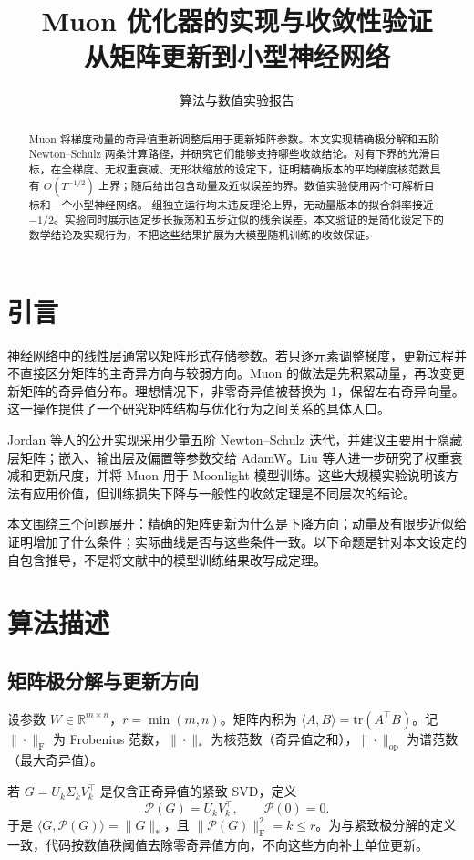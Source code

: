 \documentclass[11pt,a4paper]{article}
\title{Muon 优化器的实现与收敛性验证\\[5pt]\large 从矩阵更新到小型神经网络}
\author{算法与数值实验报告}
\date{}
\theoremstyle{definition}
\newcommand{\F}{\mathrm{F}}
\newcommand{\op}{\mathrm{op}}
\newcommand{\Pol}{\mathcal{P}}
\begin{document}
\maketitle
\begin{abstract}
Muon 将梯度动量的奇异值重新调整后用于更新矩阵参数。本文实现精确极分解和五阶 Newton--Schulz 两条计算路径，并研究它们能够支持哪些收敛结论。对有下界的光滑目标，在全梯度、无权重衰减、无形状缩放的设定下，证明精确版本的平均梯度核范数具有 $O(T^{-1/2})$ 上界；随后给出包含动量及近似误差的界。数值实验使用两个可解析目标和一个小型神经网络。\NumRuns{} 组独立运行均未违反理论上界，无动量版本的拟合斜率接近 $-1/2$。实验同时展示固定步长振荡和五步近似的残余误差。本文验证的是简化设定下的数学结论及实现行为，不把这些结果扩展为大模型随机训练的收敛保证。
\end{abstract}

\section{引言}
神经网络中的线性层通常以矩阵形式存储参数。若只逐元素调整梯度，更新过程并不直接区分矩阵的主奇异方向与较弱方向。Muon 的做法是先积累动量，再改变更新矩阵的奇异值分布。理想情况下，非零奇异值被替换为 1，保留左右奇异向量。这一操作提供了一个研究矩阵结构与优化行为之间关系的具体入口。

Jordan 等人的公开实现\cite{jordan}采用少量五阶 Newton--Schulz 迭代，并建议主要用于隐藏层矩阵；嵌入、输出层及偏置等参数交给 AdamW。Liu 等人\cite{liu}进一步研究了权重衰减和更新尺度，并将 Muon 用于 Moonlight 模型训练。这些大规模实验说明该方法有应用价值，但训练损失下降与一般性的收敛定理是不同层次的结论。

本文围绕三个问题展开：精确的矩阵更新为什么是下降方向；动量及有限步近似给证明增加了什么条件；实际曲线是否与这些条件一致。以下命题是针对本文设定的自包含推导，不是将文献中的模型训练结果改写成定理。

\section{算法描述}
\subsection{矩阵极分解与更新方向}
设参数 $W\in\mathbb R^{m\times n}$，$r=\min(m,n)$。矩阵内积为
$\langle A,B\rangle=\mathrm{tr}(A^\top B)$。记 $\|\cdot\|_\F$ 为 Frobenius 范数，$\|\cdot\|_*$ 为核范数（奇异值之和），$\|\cdot\|_\op$ 为谱范数（最大奇异值）。

若 $G=U_k\Sigma_kV_k^\top$ 是仅含正奇异值的紧致 SVD，定义
\begin{equation}
  \Pol(G)=U_kV_k^\top,\qquad \Pol(0)=0.
\end{equation}
于是 $\langle G,\Pol(G)\rangle=\|G\|_*$，且
$\|\Pol(G)\|_\F^2=k\le r$。为与紧致极分解的定义一致，代码按数值秩阈值去除零奇异值方向，不向这些方向补上单位更新。
\end{document}
